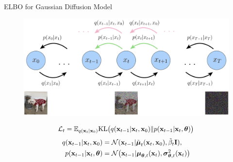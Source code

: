 \documentclass{beamer}
\begin{document}
\begin{frame}{ELBO for Gaussian Diffusion Model}
    \begin{figure}
        \includegraphics[width=\linewidth]{figs/diffusion_objective}
    \end{figure}
    \[
        \mathcal{L}_t = \mathbb{E}_{q(\mathbf{x}_t | \mathbf{x}_0)} \mathrm{KL} \bigl(q(\mathbf{x}_{t-1} | \mathbf{x}_t, \mathbf{x}_0) \| p(\mathbf{x}_{t - 1} | \mathbf{x}_t, \boldsymbol{\theta} )\bigr)
    \]
    \begin{align*}
        q(\mathbf{x}_{t-1} | \mathbf{x}_t, \mathbf{x}_0) &= \mathcal{N}(\mathbf{x}_{t-1} | \tilde{\boldsymbol{\mu}}_t(\mathbf{x}_t, \mathbf{x}_0), \tilde{\beta}_t \mathbf{I}), \\
        p(\mathbf{x}_{t - 1} | \mathbf{x}_t, \boldsymbol{\theta}) &= \mathcal{N} \bigl(\mathbf{x}_{t - 1} | \boldsymbol{\mu}_{\boldsymbol{\theta}, t}(\mathbf{x}_t), \boldsymbol{\sigma}_{\boldsymbol{\theta}, t}^2(\mathbf{x}_t)\bigr)
    \end{align*}
\end{frame}
\end{document}
